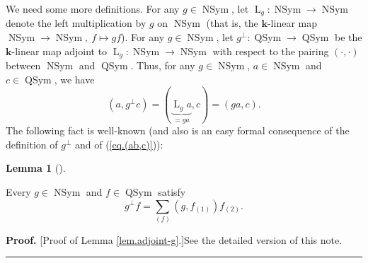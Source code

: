\documentclass[numbers=enddot,12pt,final,onecolumn,notitlepage,abstracton]{scrartcl}%
\theoremstyle{definition}
\newtheorem{lem}[theo]{Lemma}
\newenvironment{lemma}[1][]
{\begin{lem}[#1]\begin{leftbar}}
{\end{leftbar}\end{lem}}
\newenvironment{proof}[1][Proof]{\noindent\textbf{#1.} }{\ \rule{0.5em}{0.5em}}
\newenvironment{vershort}{}{}
\let\sumnonlimits\sum
\renewcommand{\sum}{\sumnonlimits\limits}
\begin{document}
We need some more definitions. For any $g\in\operatorname*{NSym}$, let
$\operatorname{L}_{g}:\operatorname*{NSym}\rightarrow\operatorname*{NSym}$
denote the left multiplication by $g$ on $\operatorname*{NSym}$ (that is, the
$\mathbf{k}$-linear map $\operatorname{NSym}\rightarrow\operatorname{NSym}%
,\ f\mapsto gf$). For any $g\in\operatorname{NSym}$, let $g^{\perp
}:\operatorname*{QSym}\rightarrow\operatorname*{QSym}$ be the $\mathbf{k}%
$-linear map adjoint to $\operatorname{L}_{g}:\operatorname*{NSym}%
\rightarrow\operatorname*{NSym}$ with respect to the pairing $\left(
\cdot,\cdot\right)  $ between $\operatorname*{NSym}$ and $\operatorname*{QSym}%
$. Thus, for any $g\in\operatorname*{NSym}$, $a\in\operatorname*{NSym}$ and
$c\in\operatorname*{QSym}$, we have%
\begin{equation}
\left(  a,g^{\perp}c\right)  =\left(  \underbrace{\operatorname*{L}%
\nolimits_{g}a}_{=ga},c\right)  =\left(  ga,c\right)  .
\label{pf.lem.adjoint-g.pre}%
\end{equation}
The following fact is well-known (and also is an easy formal consequence of
the definition of $g^{\perp}$ and of (\ref{eq.(ab,c)})):

\begin{lemma}
\label{lem.adjoint-g}Every $g\in\operatorname*{NSym}$ and $f\in
\operatorname*{QSym}$ satisfy%
\begin{equation}
g^{\perp}f=\sum_{\left(  f\right)  }\left(  g,f_{\left(  1\right)  }\right)
f_{\left(  2\right)  }. \label{pf.hmDless.1}%
\end{equation}

\end{lemma}

\begin{vershort}
\begin{proof}
[Proof of Lemma \ref{lem.adjoint-g}.]See the detailed version of this note.
\end{proof}
\end{vershort}
\end{document}
